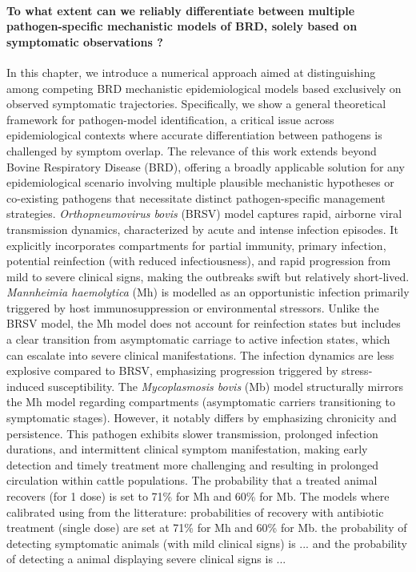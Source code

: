 \paragraph{To what extent can we reliably differentiate between multiple pathogen-specific mechanistic models of BRD, solely based on symptomatic observations ?} In this chapter, we introduce a numerical approach aimed at distinguishing among competing BRD mechanistic epidemiological models \cite{sorindupont_modeling_2023} based exclusively on observed symptomatic trajectories. Specifically, we show a general theoretical framework for pathogen-model identification, a critical issue across epidemiological contexts where accurate differentiation between pathogens is challenged by symptom overlap. The relevance of this work extends beyond Bovine Respiratory Disease (BRD), offering a broadly applicable solution for any epidemiological scenario involving multiple plausible mechanistic hypotheses or co-existing pathogens that necessitate distinct pathogen-specific management strategies. \textit{Orthopneumovirus bovis} (BRSV) model captures rapid, airborne viral transmission dynamics, characterized by acute and intense infection episodes. It explicitly incorporates compartments for partial immunity, primary infection, potential reinfection (with reduced infectiousness), and rapid progression from mild to severe clinical signs, making the outbreaks swift but relatively short-lived. \textit{Mannheimia haemolytica} (Mh) is modelled as an opportunistic infection primarily triggered by host immunosuppression or environmental stressors. Unlike the BRSV model, the Mh model does not account for reinfection states but includes a clear transition from asymptomatic carriage to active infection states, which can escalate into severe clinical manifestations. The infection dynamics are less explosive compared to BRSV, emphasizing progression triggered by stress-induced susceptibility. The \textit{Mycoplasmosis bovis} (Mb) model structurally mirrors the Mh model regarding compartments (asymptomatic carriers transitioning to symptomatic stages). However, it notably differs by emphasizing chronicity and persistence. This pathogen exhibits slower transmission, prolonged infection durations, and intermittent clinical symptom manifestation, making early detection and timely treatment more challenging and resulting in prolonged circulation within cattle populations. The probability that a treated animal recovers (for 1 dose) is set to 71\% for  Mh and 60\% for Mb. The models where calibrated using from the litterature: probabilities of recovery with antibiotic treatment (single dose) are set at 71\% for Mh and 60\% for Mb. the probability of detecting symptomatic animals (with mild clinical signs) is ... and the probability of detecting a animal displaying severe clinical signs is ...


